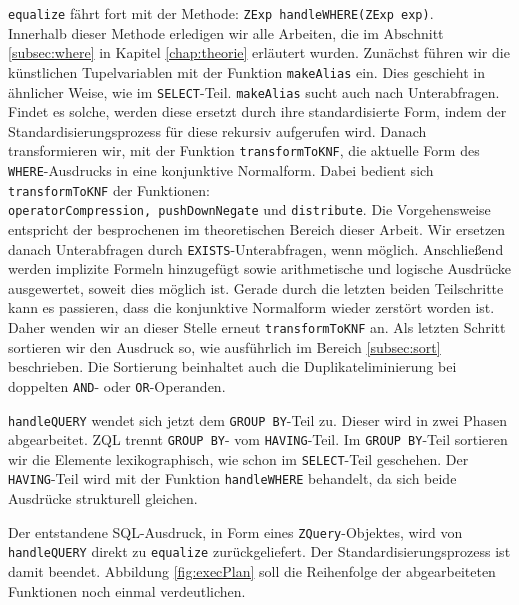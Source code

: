 \verb|equalize| fährt fort mit der Methode: \verb|ZExp handleWHERE(ZExp exp)|.\\
Innerhalb dieser Methode erledigen wir alle Arbeiten, die im Abschnitt \ref{subsec:where} in Kapitel \ref{chap:theorie} erläutert wurden. Zunächst führen wir die künstlichen Tupelvariablen mit der Funktion \verb|makeAlias| ein. Dies geschieht in ähnlicher Weise, wie im \verb|SELECT|-Teil. \verb|makeAlias| sucht auch nach Unterabfragen. Findet es solche, werden diese ersetzt durch ihre standardisierte Form, indem der Standardisierungsprozess für diese rekursiv aufgerufen wird. Danach transformieren wir, mit der Funktion \verb|transformToKNF|, die aktuelle Form des \verb|WHERE|-Ausdrucks in eine konjunktive Normalform. Dabei bedient sich \verb|transformToKNF| der Funktionen:\\
\verb|operatorCompression, pushDownNegate| und \verb|distribute|. Die Vorgehensweise entspricht der besprochenen im theoretischen Bereich dieser Arbeit. Wir ersetzen danach Unterabfragen durch \verb|EXISTS|-Unterabfragen, wenn möglich. Anschließend werden implizite Formeln hinzugefügt sowie arithmetische und logische Ausdrücke ausgewertet, soweit dies möglich ist. Gerade durch die letzten beiden Teilschritte kann es passieren, dass die konjunktive Normalform wieder zerstört worden ist. Daher wenden wir an dieser Stelle erneut \verb|transformToKNF| an. Als letzten Schritt sortieren wir den Ausdruck so, wie ausführlich im Bereich \ref{subsec:sort} beschrieben. Die Sortierung beinhaltet auch die Duplikateliminierung bei doppelten \verb|AND|- oder \verb|OR|-Operanden.

\verb|handleQUERY| wendet sich jetzt dem \verb|GROUP BY|-Teil zu. Dieser wird in zwei Phasen abgearbeitet. ZQL trennt \verb|GROUP BY|- vom \verb|HAVING|-Teil. Im \verb|GROUP BY|-Teil sortieren wir die Elemente lexikographisch, wie schon im \verb|SELECT|-Teil geschehen. Der \verb|HAVING|-Teil wird mit der Funktion \verb|handleWHERE| behandelt, da sich beide Ausdrücke strukturell gleichen.

Der entstandene SQL-Ausdruck, in Form eines \verb|ZQuery|-Objektes, wird von \verb|handleQUERY| direkt zu \verb|equalize| zurückgeliefert. Der Standardisierungsprozess ist damit beendet. Abbildung \ref{fig:execPlan} soll die Reihenfolge der abgearbeiteten Funktionen noch einmal verdeutlichen. 

